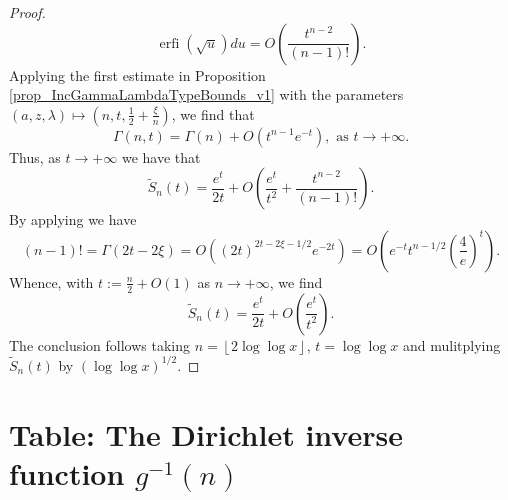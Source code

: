 \documentclass[11pt,reqno,a4letter]{article}
\numberwithin{figure}{section}
\numberwithin{table}{section}
\newcommand{\floor}[1]{\left\lfloor #1 \right\rfloor}
\theoremstyle{plain}
\numberwithin{theorem}{section}
\theoremstyle{definition}
\begin{document}
\begin{proof}
\[     \operatorname{erfi}\left(\sqrt{u}\right) du = 
     O\left(\frac{t^{n-2}}{(n-1)!}\right). 
\]
Applying the first estimate in 
Proposition \ref{prop_IncGammaLambdaTypeBounds_v1} with the parameters 
$(a, z, \lambda) \mapsto \left(n, t, \frac{1}{2} + \frac{\xi}{n}\right)$, 
we find that 
\[
\Gamma(n, t) = \Gamma(n) + O\left(t^{n-1} e^{-t}\right), \text{\ as\ } t \rightarrow + \infty.
\]
Thus, as $t \rightarrow +\infty$ we have that 
\[
\widetilde{S}_n(t) = \frac{e^t}{2t} + O\left(\frac{e^t}{t^2} + \frac{t^{n-2}}{(n-1)!}\right). 
\]
By applying \cite[Eq.\ (5.11.8)]{NISTHB} we have 
\[
(n-1)! = \Gamma(2t-2\xi) = O\left((2t)^{2t-2\xi-1/2} e^{-2t}\right) = 
     O\left(e^{-t} t^{n-1/2} \left(\frac{4}{e}\right)^t\right). 
\]
Whence, with $t := \frac{n}{2} + O(1)$ as $n \rightarrow +\infty$, we find 
\[
\widetilde{S}_n(t) = \frac{e^t}{2t} + O\left(\frac{e^t}{t^2}\right). 
\]
The conclusion follows taking $n = \floor{2\log\log x}$, $t = \log\log x$ and 
mulitplying $\widetilde{S}_n(t)$ by $(\log\log x)^{1/2}$. 
\end{proof}

\newpage
\section{Table: The Dirichlet inverse function $g^{-1}(n)$} 
\label{table_conjecture_Mertens_ginvSeq_approx_values}
\end{document}
